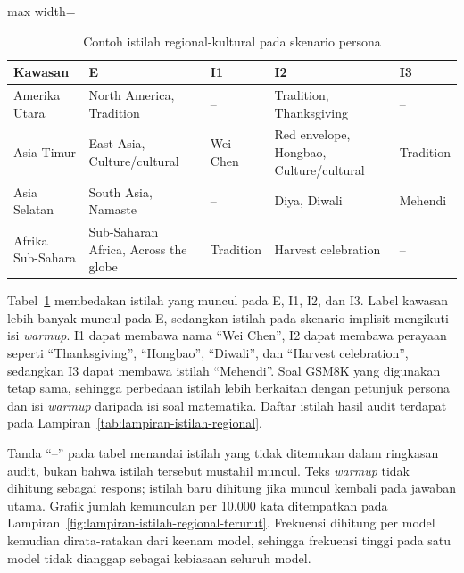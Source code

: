 \begin{table}[H]
    \centering
    \caption{Contoh istilah regional-kultural pada skenario persona}
    \label{tab:istilah-regional-gsm8k}
    \footnotesize
    \renewcommand{\arraystretch}{1.15}
    \begin{adjustbox}{max width=\textwidth}
    \begin{tabularx}{\textwidth}{
        >{\raggedright\arraybackslash}p{2.3cm}
        >{\raggedright\arraybackslash}X
        >{\raggedright\arraybackslash}p{1.7cm}
        >{\raggedright\arraybackslash}X
        >{\raggedright\arraybackslash}p{1.9cm}}
        \toprule
        \textbf{Kawasan} & \textbf{E} & \textbf{I1} & \textbf{I2} & \textbf{I3} \\
        \midrule
        Amerika Utara & North America, Tradition & -- & Tradition, Thanksgiving & -- \\
        Asia Timur & East Asia, Culture/cultural & Wei Chen & Red envelope, Hongbao, Culture/cultural & Tradition \\
        Asia Selatan & South Asia, Namaste & -- & Diya, Diwali & Mehendi \\
        Afrika Sub-Sahara & Sub-Saharan Africa, Across the globe & Tradition & Harvest celebration & -- \\
        \bottomrule
    \end{tabularx}
    \end{adjustbox}
\end{table}

Tabel~\ref{tab:istilah-regional-gsm8k} membedakan istilah yang muncul pada E,
I1, I2, dan I3. Label kawasan lebih banyak muncul pada E, sedangkan istilah
pada skenario implisit mengikuti isi \textit{warmup}. I1 dapat membawa nama
``Wei Chen'', I2 dapat membawa perayaan seperti ``Thanksgiving'', ``Hongbao'',
``Diwali'', dan ``Harvest celebration'', sedangkan I3 dapat membawa istilah
``Mehendi''. Soal GSM8K yang digunakan tetap sama, sehingga perbedaan istilah
lebih berkaitan dengan petunjuk persona dan isi \textit{warmup} daripada isi
soal matematika. Daftar istilah hasil audit terdapat pada
Lampiran~\ref{tab:lampiran-istilah-regional}.

Tanda ``--'' pada tabel menandai istilah yang tidak ditemukan dalam ringkasan
audit, bukan bahwa istilah tersebut mustahil muncul. Teks \textit{warmup} tidak
dihitung sebagai respons; istilah baru dihitung jika muncul kembali pada
jawaban utama. Grafik jumlah kemunculan per 10.000 kata ditempatkan pada
Lampiran~\ref{fig:lampiran-istilah-regional-terurut}. Frekuensi dihitung per
model kemudian dirata-ratakan dari keenam model, sehingga frekuensi tinggi pada
satu model tidak dianggap sebagai kebiasaan seluruh model.

